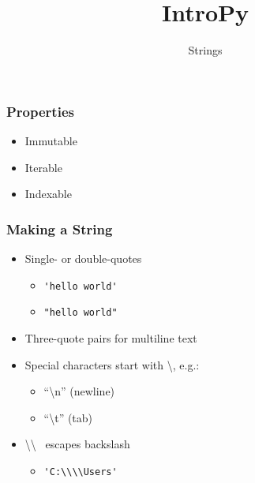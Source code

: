 \documentclass{beamer}
\title{IntroPy}
\subtitle{Strings}
\begin{document}
\frame{\titlepage}


%
%
\begin{frame}
  \frametitle{Properties}
  \begin{itemize}
    \item Immutable
    \item Iterable
    \item Indexable
  \end{itemize}
\end{frame}


%
%
\begin{frame}
  \frametitle{Making a String}
  \begin{itemize}
    \item Single- or double-quotes
      \begin{itemize}
        \item \lstinline{'hello world'} 
	\item \lstinline{"hello world"}
      \end{itemize}

    \item Three-quote pairs for multiline text

    \item Special characters start with \textbackslash, e.g.: 
      \begin{itemize}
        \item ``\textbackslash n'' (newline)
	\item ``\textbackslash t'' (tab) 
      \end{itemize}

    \item \textbackslash \textbackslash~ escapes backslash 
      \begin{itemize}
        \item \lstinline{'C:\\\\Users'}
      \end{itemize}

 \end{itemize}
\end{frame}
\end{document}

